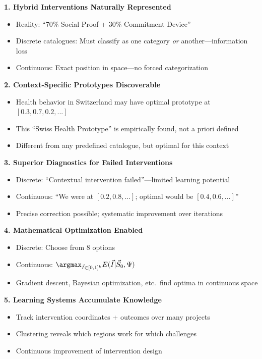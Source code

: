 \begin{tcolorbox}[colback=green!5!white, colframe=green!50!black,
    title=\textbf{Five Practical Advantages of $[0,1]^k$ Over Discrete Types}]

\textbf{1. Hybrid Interventions Naturally Represented}
\begin{itemize}[nosep]
    \item Reality: ``70\% Social Proof + 30\% Commitment Device''
    \item Discrete catalogues: Must classify as one category \textit{or} another---information loss
    \item Continuous: Exact position in space---no forced categorization
\end{itemize}

\textbf{2. Context-Specific Prototypes Discoverable}
\begin{itemize}[nosep]
    \item Health behavior in Switzerland may have optimal prototype at $[0.3, 0.7, 0.2, ...]$
    \item This ``Swiss Health Prototype'' is empirically found, not a priori defined
    \item Different from any predefined catalogue, but optimal for this context
\end{itemize}

\textbf{3. Superior Diagnostics for Failed Interventions}
\begin{itemize}[nosep]
    \item Discrete: ``Contextual intervention failed''---limited learning potential
    \item Continuous: ``We were at $[0.2, 0.8, ...]$; optimal would be $[0.4, 0.6, ...]$''
    \item Precise correction possible; systematic improvement over iterations
\end{itemize}

\textbf{4. Mathematical Optimization Enabled}
\begin{itemize}[nosep]
    \item Discrete: Choose from 8 options
    \item Continuous: $\argmax_{\vec{I} \in [0,1]^k} E(\vec{I} | \vec{S}_0, \Psi)$
    \item Gradient descent, Bayesian optimization, etc.\ find optima in continuous space
\end{itemize}

\textbf{5. Learning Systems Accumulate Knowledge}
\begin{itemize}[nosep]
    \item Track intervention coordinates + outcomes over many projects
    \item Clustering reveals which regions work for which challenges
    \item Continuous improvement of intervention design
\end{itemize}

\end{tcolorbox}

